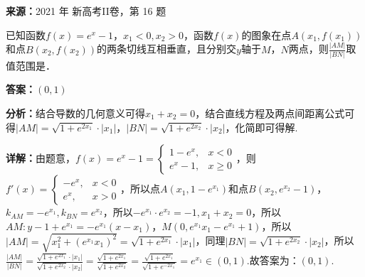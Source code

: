 \begin{question}[points=5]
\textbf{来源：}2021 年 新高考II卷，第 16 题\par
已知函数$f(x)=e^x-1$，$x_1<0,x_2>0$，函数$f(x)$的图象在点$A(x_1,f(x_1))$和点$B(x_2,f(x_2))$的两条切线互相垂直，且分别交$y$轴于$M$，$N$两点，则$\frac{|AM|}{|BN|}$取值范围是．
\fillin[{$(0,1)$}]
\begin{solution}
\textbf{答案：}$(0,1)$

\textbf{分析：}结合导数的几何意义可得$x_1+x_2=0$，结合直线方程及两点间距离公式可得$|AM|=\sqrt{1+e^{2x_1}}\cdot|x_1|$，$|BN|=\sqrt{1+e^{2x_2}}\cdot|x_2|$，化简即可得解.

\textbf{详解：}由题意，$f(x)=e^x-1=\begin{cases} 1-e^x, & x<0 \\ e^x-1, & x\ge0 \end{cases}$，则$f'(x)=\begin{cases} -e^x, & x<0 \\ e^x, & x>0 \end{cases}$，所以点$A(x_1,1-e^{x_1})$和点$B(x_2,e^{x_2}-1)$，$k_{AM}=-e^{x_1},k_{BN}=e^{x_2}$，所以$-e^{x_1}\cdot e^{x_2}=-1,x_1+x_2=0$，所以$AM: y-1+e^{x_1}=-e^{x_1}(x-x_1)$，$M(0,e^{x_1}x_1-e^{x_1}+1)$，所以$|AM|=\sqrt{x_1^2+(e^{x_1}x_1)^2}=\sqrt{1+e^{2x_1}}\cdot|x_1|$，同理$|BN|=\sqrt{1+e^{2x_2}}\cdot|x_2|$，所以$\frac{|AM|}{|BN|}=\frac{\sqrt{1+e^{2x_1}}\cdot|x_1|}{\sqrt{1+e^{2x_2}}\cdot|x_2|}=\frac{\sqrt{1+e^{2x_1}}}{\sqrt{1+e^{2x_2}}}=\frac{\sqrt{1+e^{2x_1}}}{\sqrt{1+e^{-2x_1}}}=e^{x_1}\in(0,1)$.故答案为：$(0,1)$.
\end{solution}
\end{question}

